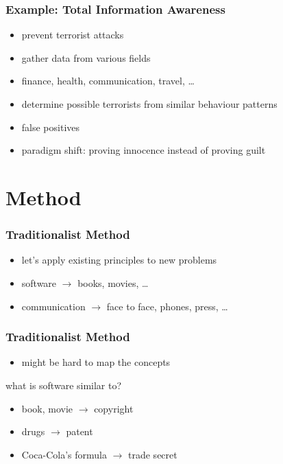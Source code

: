 \documentclass[dvipsnames]{beamer}
\theoremstyle{plain}
\begin{document}
\begin{frame}
  \frametitle{Example: Total Information Awareness}

  \begin{itemize}
    \item prevent terrorist attacks

    \medskip
    \item gather data from various fields
    \item finance, health, communication, travel, \ldots
    \item determine possible terrorists from similar behaviour patterns

    \bigskip
    \item false positives
    \item paradigm shift: proving innocence instead of proving guilt
  \end{itemize}
\end{frame}

\section{Method}

\begin{frame}
  \frametitle{Traditionalist Method}

  \begin{itemize}
    \item let's apply existing principles to new problems

    \bigskip
    \item software $\rightarrow$ books, movies, \ldots
    \item communication $\rightarrow$ face to face, phones, press, \ldots
  \end{itemize}
\end{frame}

\begin{frame}
  \frametitle{Traditionalist Method}

  \begin{itemize}
    \item might be hard to map the concepts
  \end{itemize}

  \begin{exampleblock}{what is software similar to?}
    \begin{itemize}
      \item book, movie $\rightarrow$ copyright
      \item drugs $\rightarrow$ patent
      \item Coca-Cola's formula $\rightarrow$ trade secret
    \end{itemize}
  \end{exampleblock}
\end{frame}
\end{document}
